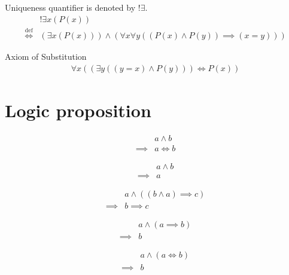 \begin{defn}
\label{Definition:uniqueness_quantifier}
Uniqueness quantifier is denoted by $!\exists$.
\begin{align*}
& !\exists x (P(x)) \\
\overset{\operatorname{def}}{\iff} & (\exists x (P(x))) \land (\forall x \forall y ((P(x) \land P(y)) \implies (x = y)))
\end{align*}
\end{defn}

\begin{axm}
\label{Axiom:axiom_of_substitution}
Axiom of Substitution
\begin{align*}
\forall x ((\exists y ((y = x) \land P(y))) \iff P(x))
\end{align*}
\end{axm}

\section{Logic proposition}
\begin{prop}
\label{Proposition:land_implies_iff}
\begin{align*}
& a \land b \\
\implies & a \iff b
\end{align*}
\end{prop}

\begin{prop}
\label{Proposition:land_omit}
\begin{align*}
& a \land b \\
\implies & a
\end{align*}
\end{prop}

\begin{prop}
\label{Proposition:lemma_uniqueness}
\begin{align*}
& a \land ((b \land a) \implies c) \\
\implies & b \implies c
\end{align*}
\end{prop}

\begin{prop}
\label{Proposition:implies_satisfy}
\begin{align*}
& a \land (a \implies b) \\
\implies & b
\end{align*}
\end{prop}

\begin{prop}
\label{Proposition:iff_satisfy}
\begin{align*}
& a \land (a \iff b) \\
\implies & b
\end{align*}
\end{prop}

